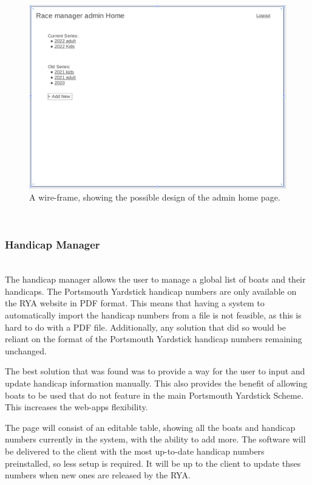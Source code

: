 \documentclass{l4proj}
\begin{document}
\begin{figure}[h!]
    \centering
    \includegraphics[width=1\linewidth]{images/admin home 2.png} 

    \caption{A wire-frame, showing the possible design of the admin home page.
    }

    \label{fig:adminHomeWF}
\end{figure}

\hfill\\
\subsubsection{Handicap Manager}
\hfill\\
The handicap manager allows the user to manage a global list of boats and their handicaps. The Portsmouth Yardstick handicap numbers are only available on the RYA website in PDF format. This means that having a system to automatically import the handicap numbers from a file is not feasible, as this is hard to do with a PDF file. Additionally, any solution that did so would be reliant on the format of the Portsmouth Yardstick handicap numbers remaining unchanged.

The best solution that was found was to provide a way for the user to input and update handicap information manually. This also provides the benefit of allowing boats to be used that do not feature in the main Portsmouth Yardstick Scheme. This increases the web-apps flexibility.

The page will consist of an editable table, showing all the boats and handicap numbers currently in the system, with the ability to add more. The software will be delivered to the client with the most up-to-date handicap numbers preinstalled, so less setup is required. It will be up to the client to update thses numbers when new ones are released by the RYA.
\end{document}
